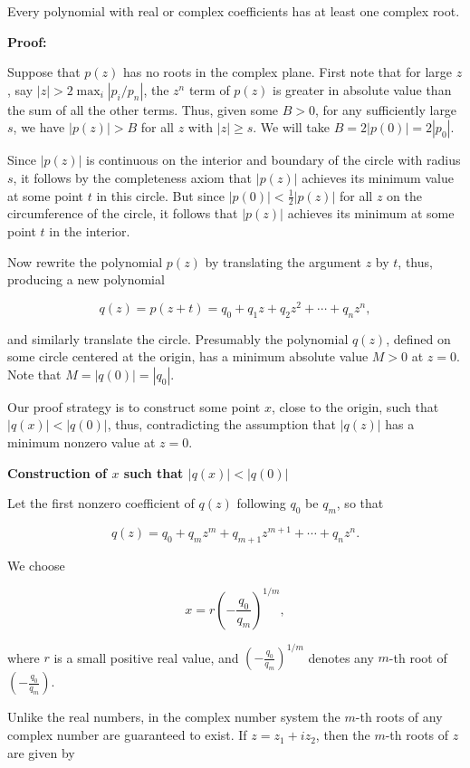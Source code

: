 Every polynomial with real or complex coefficients has at least one complex root.

\textbf{Proof:}

Suppose that \(p(z)\) has no roots in the complex plane. First note that for large \(z\), say 
\(|z| > 2 \max_i |p_i/p_n|\), the \(z^n\) term of \(p(z)\) is greater in absolute 
value than the sum of all the other terms. Thus, given some \(B > 0\), for any sufficiently large \(s\), 
we have \(|p(z)| > B\) for all \(z\) with \(|z| \geq s\). We will take \(B = 2|p(0)| = 2|p_0|\).

Since \(|p(z)|\) is continuous on the interior and boundary of the circle with radius \(s\), it follows 
by the completeness axiom that \(|p(z)|\) achieves its minimum value at some point \(t\) in this circle. 
But since \(|p(0)| < \frac{1}{2} |p(z)|\) for all \(z\) on the circumference of the circle, it follows 
that \(|p(z)|\) achieves its minimum at some point \(t\) in the interior.

Now rewrite the polynomial \(p(z)\) by translating the argument \(z\) by \(t\), thus, producing a 
new polynomial

\[
	q(z) = p(z + t) = q_0 + q_1 z + q_2 z^2 + \cdots + q_n z^n,
\]

and similarly translate the circle. Presumably the polynomial \(q(z)\), defined on some circle centered 
at the origin, has a minimum absolute value \(M > 0\) at \(z = 0\). Note that \(M = |q(0)| = |q_0|\).

Our proof strategy is to construct some point \(x\), close to the origin, such that \(|q(x)| < |q(0)|\), 
thus, contradicting the assumption that \(|q(z)|\) has a minimum nonzero value at \(z = 0\).

\textbf{Construction of \(x\) such that \(|q(x)| < |q(0)|\)}

Let the first nonzero coefficient of \(q(z)\) following \(q_0\) be \(q_m\), so that

\[
	q(z) = q_0 + q_m z^m + q_{m+1} z^{m+1} + \cdots + q_n z^n.
\]

We choose

\[
	x = r {\left(-\frac{q_0}{q_m}\right)}^{1/m},
\]

where \(r\) is a small positive real value, and \({\left(-\frac{q_0}{q_m}\right)}^{1/m}\) denotes any 
\(m\)-th root of \(\left(-\frac{q_0}{q_m}\right)\).

Unlike the real numbers, in the complex number system the \(m\)-th roots of any complex number are 
guaranteed to exist. If \(z = z_1 + i z_2\), then the \(m\)-th roots of \(z\) are given by

